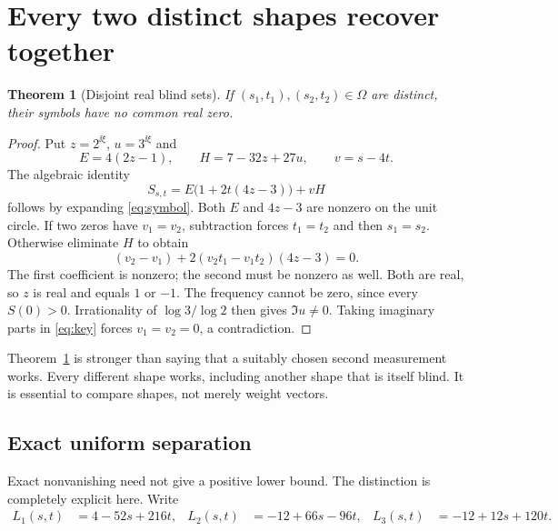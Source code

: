 \documentclass[11pt]{article}
\newtheorem{theorem}{Theorem}[section]
\theoremstyle{definition}\newtheorem{definition}[theorem]{Definition}
\theoremstyle{remark}\newtheorem{remark}[theorem]{Remark}
\newcommand{\Shape}{\Omega}
\begin{document}
\section{Every two distinct shapes recover together}

\begin{theorem}[Disjoint real blind sets]\label{thm:pair}
If $(s_1,t_1),(s_2,t_2)\in\Shape$ are distinct, their symbols have no common real zero.
\end{theorem}
\begin{proof}
Put $z=2^{\ii\xi}$, $u=3^{\ii\xi}$ and
\[
 E=4(2z-1),\qquad H=7-32z+27u,\qquad v=s-4t.
\]
The algebraic identity
\begin{equation}\label{eq:key}
 S_{s,t}=E\bigl(1+2t(4z-3)\bigr)+vH
\end{equation}
follows by expanding \eqref{eq:symbol}. Both $E$ and $4z-3$ are nonzero
on the unit circle. If two zeros have $v_1=v_2$, subtraction forces
$t_1=t_2$ and then $s_1=s_2$. Otherwise eliminate $H$ to obtain
\[
 (v_2-v_1)+2(v_2t_1-v_1t_2)(4z-3)=0.
\]
The first coefficient is nonzero; the second must be nonzero as well.
Both are real, so $z$ is real and equals $1$ or $-1$.
The frequency cannot be zero, since every $S(0)>0$.
Irrationality of $\log3/\log2$ then gives $\Im u\ne0$.
Taking imaginary parts in \eqref{eq:key} forces $v_1=v_2=0$, a contradiction.
\end{proof}

Theorem~\ref{thm:pair} is stronger than saying that a suitably chosen second
measurement works. Every different shape works, including another shape that
is itself blind. It is essential to compare shapes, not merely weight vectors.

\subsection{Exact uniform separation}

Exact nonvanishing need not give a positive lower bound. The distinction is
completely explicit here. Write
\begin{align}\label{eq:lines}
 L_1(s,t)&=4-52s+216t,&
 L_2(s,t)&=-12+66s-96t,&
 L_3(s,t)&=-12+12s+120t.
\end{align}
\end{document}
